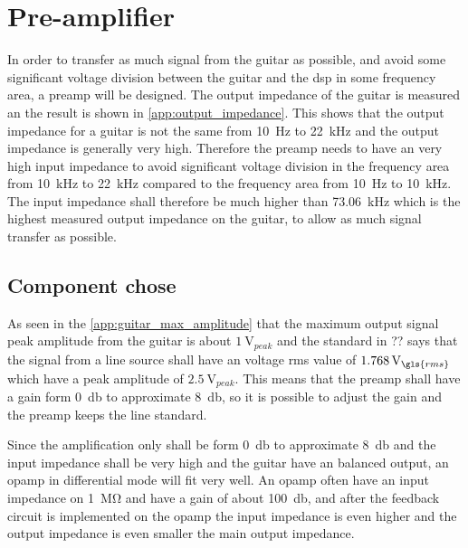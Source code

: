 \section{Pre-amplifier}
In order to transfer as much signal from the guitar as possible, and avoid some significant voltage division between the guitar and the \gls{dsp} in some frequency area, a \gls{preamp} will be designed. The output impedance of the guitar is measured an the result is shown in \autoref{app:output_impedance}. This shows that the output impedance for a guitar is not the same from \SI{10}{\hertz} to \SI{22}{\kilo\hertz} and the output impedance is generally very high. Therefore the \gls{preamp} needs to have an very high input impedance to avoid significant voltage division in the frequency area from \SI{10}{\kilo\hertz} to \SI{22}{\kilo\hertz} compared to the frequency area from \SI{10}{\hertz} to \SI{10}{\kilo\hertz}. The input impedance shall therefore be much higher than \SI{73.06}{\kilo\hertz} which is the highest measured output impedance on the guitar, to allow as much signal transfer as possible.

\subsection{Component chose}

As seen in the \autoref{app:guitar_max_amplitude} that the maximum output signal peak amplitude from the guitar is about $\SI{1}{\volt}_{peak}$ and the standard in ?? says that the signal from a line source shall have an voltage \gls{rms} value of $\SI{1.768}{\volt}_{\gls{rms}}$ which have a peak amplitude of $\SI{2.5}{\volt}_{peak}$. This means that the \gls{preamp} shall have a gain form \SI{0}{\decibel} to approximate \SI{8}{\decibel}, so it is possible to adjust the gain and the \gls{preamp} keeps the line standard. 

Since the amplification only shall be form \SI{0}{\decibel} to approximate \SI{8}{\decibel} and the input impedance shall be very high and the guitar have an balanced output, an \gls{opamp} in differential mode will fit very well. An \gls{opamp} often have an input impedance on \SI{1}{\mega\ohm} and have a gain of about \SI{100}{\decibel}, and after the feedback circuit is implemented on the \gls{opamp} the input impedance is even higher and the output impedance is even smaller the main output impedance.

